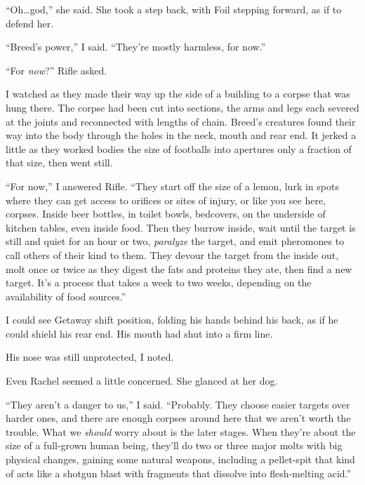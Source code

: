``Oh\ldots god,'' she said.  She took a step back, with Foil stepping forward, as if to defend her.



``Breed's power,'' I said.  ``They're mostly harmless, for now.''



``For \emph{now}?'' Rifle asked.



I watched as they made their way up the side of a building to a corpse that was hung there.  The corpse had been cut into sections, the arms and legs each severed at the joints and reconnected with lengths of chain.  Breed's creatures found their way into the body through the holes in the neck, mouth and rear end.  It jerked a little as they worked bodies the size of footballs into apertures only a fraction of that size, then went still.



``For now,'' I answered Rifle.  ``They start off the size of a lemon, lurk in spots where they can get access to orifices or sites of injury, or like you see here, corpses.  Inside beer bottles, in toilet bowls, bedcovers, on the underside of kitchen tables, even inside food.  Then they burrow inside, wait until the target is still and quiet for an hour or two, \emph{paralyze} the target, and emit pheromones to call others of their kind to them.  They devour the target from the inside out, molt once or twice as they digest the fats and proteins they ate, then find a new target.  It's a process that takes a week to two weeks, depending on the availability of food sources.''



I could see Getaway shift position, folding his hands behind his back, as if he could shield his rear end.  His mouth had shut into a firm line.



His nose was still unprotected, I noted.



Even Rachel seemed a little concerned.  She glanced at her dog.



``They aren't a danger to us,'' I said.  ``Probably.  They choose easier targets over harder ones, and there are enough corpses around here that we aren't worth the trouble.  What we \emph{should} worry about is the later stages.  When they're about the size of a full-grown human being, they'll do two or three major molts with big physical changes, gaining some natural weapons, including a pellet-spit that kind of acts like a shotgun blast with fragments that dissolve into flesh-melting acid.''



